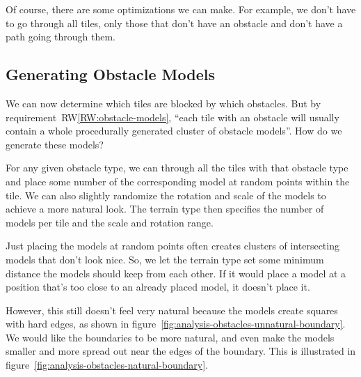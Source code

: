 Of course, there are some optimizations we can make.
For example, we don't have to go through all tiles, only those that don't have an obstacle and don't have a path going through them.

\subsection{Generating Obstacle Models}\label{sec:analysis-obstacle-models}

We can now determine which tiles are blocked by which obstacles.
But by requirement~RW\ref{RW:obstacle-models}, \enquote{each tile with an obstacle will usually contain a whole procedurally generated cluster of obstacle models}.
How do we generate these models?

For any given obstacle type, we can through all the tiles with that obstacle type and place some number of the corresponding model at random points within the tile.
We can also slightly randomize the rotation and scale of the models to achieve a more natural look.
The terrain type then specifies the number of models per tile and the scale and rotation range.

Just placing the models at random points often creates clusters of intersecting models that don't look nice.
So, we let the terrain type set some minimum distance the models should keep from each other.
If it would place a model at a position that's too close to an already placed model, it doesn't place it.

However, this still doesn't feel very natural because the models create squares with hard edges, as shown in figure~\ref{fig:analysis-obstacles-unnatural-boundary}.
We would like the boundaries to be more natural, and even make the models smaller and more spread out near the edges of the boundary.
This is illustrated in figure~\ref{fig:analysis-obstacles-natural-boundary}.


